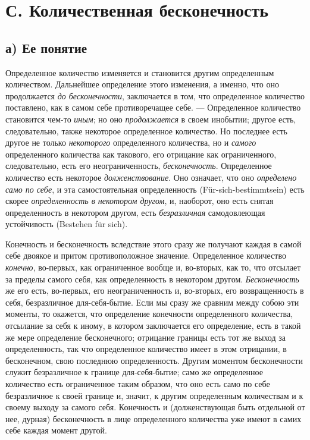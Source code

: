 \section[С. Количественная бесконечность]{С. Количественная бесконечность}
\subsection[а) Ее понятие]{а) Ее понятие}

Определенное количество изменяется и становится другим определенным
количеством. Дальнейшее определение этого изменения, а именно, что оно
продолжается {\em до бесконечности}, заключается в том,
что определенное количество поставлено, как в самом себе противоречащее
себе. — Определенное количество становится чем-то
{\em иным}; но оно
{\em продолжается} в своем инобытии; другое есть,
следовательно, также некоторое определенное количество. Но последнее есть
другое не только {\em некоторого} определенного
количества, но и {\em самого} определенного количества
как такового, его отрицание как ограниченного, следовательно, есть его
неограниченность, {\em бесконечность}. Определенное
количество есть некоторое {\em долженствование}. Оно
означает, что оно {\em определено само по себе}, и эта
самостоятельная определенность (Für-sich-bestimmtsein) есть скорее
{\em определенность в некотором другом}, и, наоборот,
оно есть снятая определенность в некотором другом, есть
{\em безразличная} самодовлеющая устойчивость (Bestehen für sich).

Конечность и бесконечность вследствие этого сразу же получают каждая в самой
себе двоякое и притом противоположное значение. Определенное количество
{\em конечно}, во-первых, как ограниченное вообще и,
во-вторых, как то, что отсылает за пределы самого себя, как определенность
в некотором другом. {\em Бесконечность} же его есть,
во-первых, его неограниченность и, во-вторых, его возвращенность в себя,
безразличное для-себя-бытие. Если мы сразу же сравним между собою эти
моменты, то окажется, что определение конечности определенного количества,
отсылание за себя к иному, в котором заключается его
определение, есть в такой же мере определение бесконечного; отрицание
границы есть тот же выход за определенность, так что определенное
количество имеет в этом отрицании, в бесконечном, свою последнюю
определенность. Другим моментом бесконечности служит безразличное к границе
для-себя-бытие; само же определенное количество есть ограниченное таким
образом, что оно есть само по себе безразличное к своей границе и, значит,
к другим определенным количествам и к своему выходу за самого себя.
Конечность и (долженствующая быть отдельной от нее, дурная) бесконечность в
лице определенного количества уже имеют в самих себе каждая момент другой.

